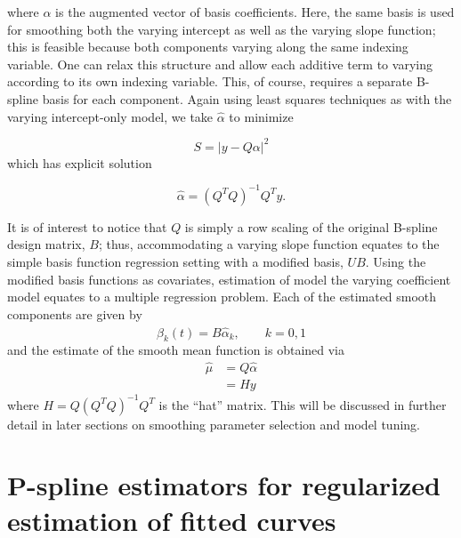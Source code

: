 \documentclass[12pt]{article}
\begin{document}
where $\alpha$ is the augmented vector of basis coefficients. Here, the same basis is used for smoothing both the varying intercept as well as the varying slope function; this is feasible because both components varying along the same indexing variable. One can relax this structure and allow each additive term to varying according to its own indexing variable. This, of course, requires a separate B-spline basis for each component. Again using least squares techniques as with the varying intercept-only model, we take $\hat{\alpha}$ to minimize

\begin{equation} \label{eq:S_varying_intercept_slope_model}
S = \vert y-Q\alpha \vert ^2
\end{equation}
which has explicit solution

\[
\hat{\alpha} =\left(Q^T Q\right)^{-1} Q^Ty.
\]

It is of interest to notice that $Q$ is simply a row scaling of the original B-spline design matrix, $B$; thus, accommodating a varying slope function equates to the simple basis function regression setting with a modified basis, $UB$. Using the modified basis functions as covariates, estimation of model the varying coefficient model equates to a multiple regression problem. Each of the estimated smooth components are given by 
\[
\hat{\beta}_k\left(t \right)= B\hat{\alpha}_k, \qquad k=0,1
\]
\noindent
and the estimate of the smooth mean function is obtained via 
\begin{align*}
\hat{\mu} &= Q\hat{\alpha}\\
&= Hy
\end{align*}
where $H = Q\left(Q^T Q\right)^{-1} Q^T$ is the ``hat'' matrix. This will be discussed in further detail in later sections on smoothing parameter selection and model tuning.










\section{P-spline estimators for regularized estimation of fitted curves}
\end{document}
